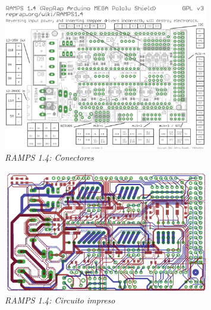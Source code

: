 \documentclass[a4paper,12pt]{article}
\begin{document}
	\begin{figure}[!ht]
	\begin{center}
	  \includegraphics[width=0.8\textwidth]{Figuras/RAMPS_14_connectors.png}
	  \caption{\emph{RAMPS 1.4: Conectores}}
	\end{center}
	\label{RAMPS_connectors}
	\end{figure}
	
	
	\begin{figure}[!ht]
	\begin{center}
	  \includegraphics[width=0.8\textwidth]{Figuras/RAMPS_14_bothsides.png}
	  \caption{\emph{RAMPS 1.4: Circuito impreso}}
	\end{center}
	\label{RAMPS_bothsides}
	\end{figure}
	
\end{document}
